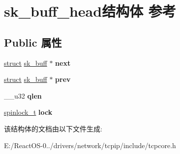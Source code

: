 \hypertarget{structsk__buff__head}{}\section{sk\+\_\+buff\+\_\+head结构体 参考}
\label{structsk__buff__head}
\subsection*{Public 属性}
\begin{DoxyCompactItemize}
\item 
\mbox{\label{structsk__buff__head_a637930fde8a9c7397a0b08c22f9186f1}} 
\hyperlink{interfacestruct}{struct} \hyperlink{structsk__buff}{sk\+\_\+buff} $\ast$ {\bfseries next}
\item 
\mbox{\label{structsk__buff__head_aee5f8dd8bcece10b6228232d9dfebc70}} 
\hyperlink{interfacestruct}{struct} \hyperlink{structsk__buff}{sk\+\_\+buff} $\ast$ {\bfseries prev}
\item 
\mbox{\label{structsk__buff__head_a6043cd960a390c4c276988e7ebf6f75f}} 
\+\_\+\+\_\+u32 {\bfseries qlen}
\item 
\mbox{\label{structsk__buff__head_a52a473b8827cec5a0216b7c29a02d025}} 
\hyperlink{structspinlock__t}{spinlock\+\_\+t} {\bfseries lock}
\end{DoxyCompactItemize}


该结构体的文档由以下文件生成\+:\begin{DoxyCompactItemize}
\item 
E\+:/\+React\+O\+S-\/0../drivers/network/tcpip/include/tcpcore.\+h\end{DoxyCompactItemize}
